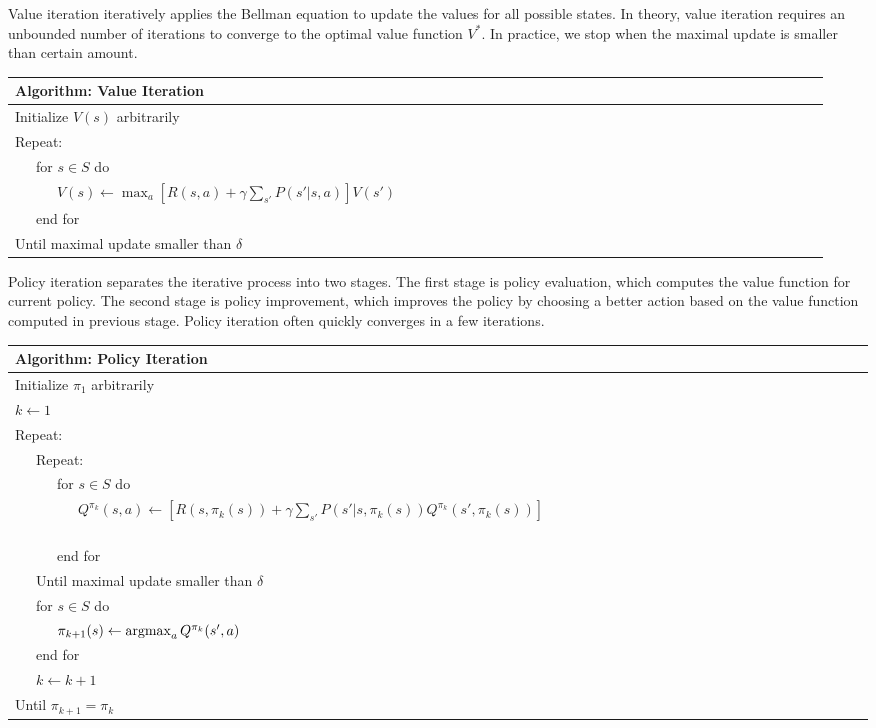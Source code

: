 Value iteration iteratively applies the Bellman equation to update the
values for all possible states. In theory, value iteration requires an unbounded number of iterations to converge to the optimal value function $V^*$.
In practice, we stop when the maximal update is smaller than certain amount.

\begin{center}
\begin{tabular}{@{}lp{6cm}@{}}
\hline
Algorithm: Value Iteration\\
\hline
Initialize $V(s)$ arbitrarily\\
Repeat:\\
\ \ \ for $s \in S$ do\\
\ \ \ \ \ \ $V(s) \leftarrow \max_a [R(s, a) + \gamma \sum_{s'} P(s'|s, a)]V(s')$\ \ \ \ \ \ \ \ \ \ \ \ \ \ \ \ \ \ \ \ \ \ \ \ \ \ \ \ \ \ \ \ \ \ \ \ \ \ \ \ \ \ \ \ \ \ \ \ \ \ \ \ \ \ \ \ \ \ \\
\ \ \ end for\\
Until maximal update smaller than $\delta$\\
\hline  
\end{tabular}
\end{center}

Policy iteration separates the iterative process into two stages. The first stage is policy evaluation, which computes the value function for
current policy. The second stage is policy improvement, which improves the
policy by choosing a better action based on the value function computed in
previous stage. Policy iteration often quickly converges in a few iterations. 

\begin{center}
\begin{tabular}{@{}lp{6cm}@{}}
\hline
Algorithm: Policy Iteration\\
\hline
Initialize $\pi_1$ arbitrarily\\
$k \leftarrow 1$\\
Repeat:\\
\ \ \ Repeat:\\
\ \ \ \ \ \ for $s \in S$ do\\
\ \ \ \ \ \ \ \ \ $Q^{\pi_k}(s, a) \leftarrow [R(s, \pi_k(s)) + \gamma \sum_{s'} P(s'|s, \pi_k(s)) Q^{\pi_k}(s', \pi_k(s))]$\ \ \ \ \ \ \ \ \ \ \ \ \ \ \ \ \ \ \ \ \ \ \ \ \ \ \ \ \ \ \ \ \ \ \ \ \ \ \ \ \ \ \ \ \ \ \ \ \\
\ \ \ \ \ \ end for\\
\ \ \ Until maximal update smaller than $\delta$\\
\ \ \ for $s \in S$ do\\
\ \ \ \ \ \ $\pi_{k+1}(s) \leftarrow \argmax_a Q^{\pi_k}(s', a)$\\
\ \ \ end for\\
\ \ \ $k \leftarrow k + 1$\\
Until $\pi_{k+1} = \pi_{k}$\\
\hline  
\end{tabular}
\end{center}

